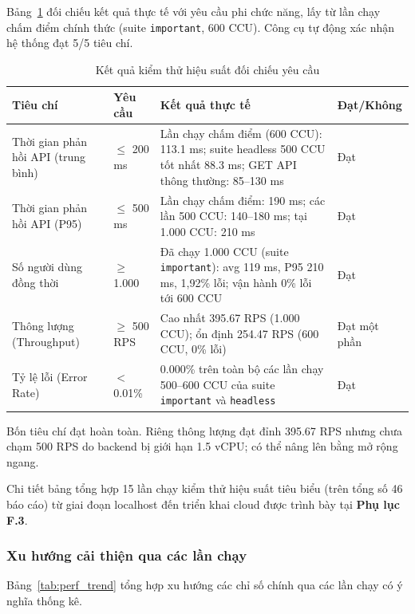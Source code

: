 Bảng~\ref{tab:perf_summary} đối chiếu kết quả thực tế với yêu cầu phi chức năng, lấy từ lần chạy chấm điểm chính thức (suite \texttt{important}, 600 CCU). Công cụ tự động xác nhận hệ thống đạt 5/5 tiêu chí.

\begin{table}[H]
\centering
\begin{tabularx}{\textwidth}{|p{}|p{}|X|p{}|}
\hline
\textbf{Tiêu chí} & \textbf{Yêu cầu} & \textbf{Kết quả thực tế} & \textbf{Đạt/Không} \\
\hline
Thời gian phản hồi API (trung bình) & $\leq$ 200 ms & Lần chạy chấm điểm (600 CCU): 113.1 ms; suite headless 500 CCU tốt nhất 88.3 ms; GET API thông thường: 85--130 ms & Đạt \\
\hline
Thời gian phản hồi API (P95) & $\leq$ 500 ms & Lần chạy chấm điểm: 190 ms; các lần 500 CCU: 140--180 ms; tại 1.000 CCU: 210 ms & Đạt \\
\hline
Số người dùng đồng thời & $\geq$ 1.000 & Đã chạy 1.000 CCU (suite \texttt{important}): avg 119 ms, P95 210 ms, 1,92\% lỗi; vận hành 0\% lỗi tới 600 CCU & Đạt \\
\hline
Thông lượng (Throughput) & $\geq$ 500 RPS & Cao nhất 395.67 RPS (1.000 CCU); ổn định 254.47 RPS (600 CCU, 0\% lỗi) & Đạt một phần \\
\hline
Tỷ lệ lỗi (Error Rate) & $<$ 0.01\% & 0.000\% trên toàn bộ các lần chạy 500--600 CCU của suite \texttt{important} và \texttt{headless} & Đạt \\
\hline
\end{tabularx}
\caption{Kết quả kiểm thử hiệu suất đối chiếu yêu cầu}
\label{tab:perf_summary}
\end{table}

Bốn tiêu chí đạt hoàn toàn. Riêng thông lượng đạt đỉnh 395.67 RPS nhưng chưa chạm 500 RPS do backend bị giới hạn 1.5 vCPU; có thể nâng lên bằng mở rộng ngang.


Chi tiết bảng tổng hợp 15 lần chạy kiểm thử hiệu suất tiêu biểu (trên tổng số 46 báo cáo) từ giai đoạn localhost đến triển khai cloud được trình bày tại \textbf{Phụ lục F.3}.

\subsubsection{Xu hướng cải thiện qua các lần chạy}

Bảng~\ref{tab:perf_trend} tổng hợp xu hướng các chỉ số chính qua các lần chạy có ý nghĩa thống kê.

